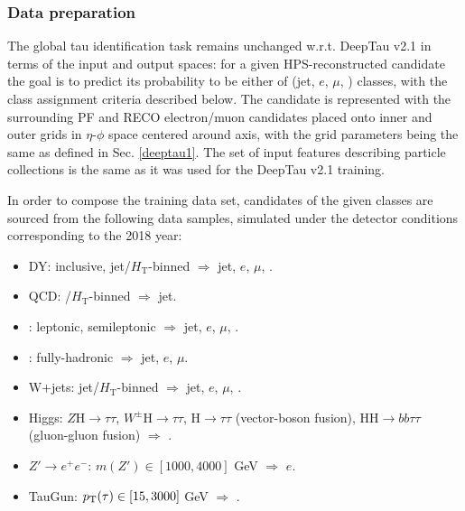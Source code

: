 \subsubsection{Data preparation}
The global tau identification task remains unchanged w.r.t. DeepTau v2.1 in terms of the input and output spaces: for a given HPS-reconstructed \tauh candidate the goal is to predict its probability to be either of (jet, $e$, $\mu$, \tauh) classes, with the class assignment criteria described below. The \tauh candidate is represented with the surrounding PF and RECO electron/muon candidates placed onto inner and outer grids in $\eta$-$\phi$ space centered around \tauh axis, with the grid parameters being the same as defined in Sec. \ref{deeptau1}. The set of input features describing particle collections is the same as it was used for the DeepTau v2.1 training.

In order to compose the training data set, \tauh candidates of the given classes are sourced from the following data samples, simulated under the detector conditions corresponding to the 2018 year:
\begin{itemize} \label{v2.5:datagroups}
    \item DY: inclusive, jet/$H_\text{T}$-binned $\Rightarrow$ jet, $e$, $\mu$, \tauh.
    \item QCD: \pt/$H_\text{T}$-binned $\Rightarrow$ jet.
    \item \ttbar: leptonic, semileptonic $\Rightarrow$ jet, $e$, $\mu$, \tauh.
    \item \ttbar: fully-hadronic $\Rightarrow$ jet, $e$, $\mu$.
    \item W+jets: jet/$H_\text{T}$-binned $\Rightarrow$ jet, $e$, $\mu$, \tauh.
    \item Higgs: $Z \text{H}\to \tau\tau$, $W^\pm \text{H}\to \tau\tau$, $\text{H}\to \tau\tau$ (vector-boson fusion), $\text{H}\text{H}\to bb\tau\tau$ (gluon-gluon fusion) $\Rightarrow$ \tauh.
    \item $Z' \to e^+e^-$: $m(Z') \in [1000, 4000]$ GeV $\Rightarrow$ $e$.  
    \item TauGun: $p_{\text{T}}(\tau) \in [15, 3000]$ GeV $\Rightarrow$ \tauh.
\end{itemize}

